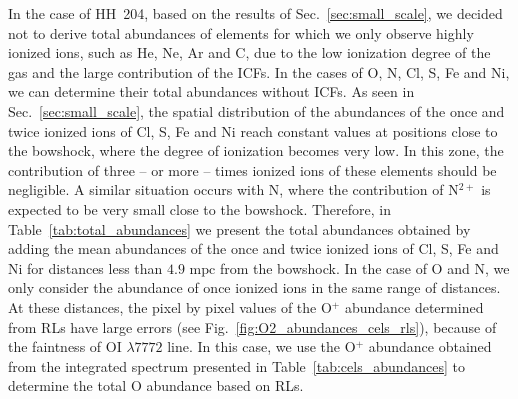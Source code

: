 \documentclass[twocolumn]{aastex63}
\begin{document}
In the case of HH~204, based on the results of Sec.~\ref{sec:small_scale}, we decided not to derive total abundances of elements for which we only observe highly ionized ions, such as He, Ne, Ar and C, due to the low ionization degree of the gas and the large contribution of the ICFs. In the cases of O, N, Cl, S, Fe and Ni, we can determine their total abundances without ICFs. %
As seen in Sec.~\ref{sec:small_scale}, the spatial distribution of the abundances of the once and twice ionized ions of Cl, S, Fe and Ni reach constant values at positions close to the bowshock, where the degree of ionization becomes very low. In this zone, the contribution of three -- or more -- times ionized ions of these elements should be negligible. A similar situation occurs with N, where the contribution of N$^{2+}$ is expected to be very small close to the bowshock. Therefore, in Table~\ref{tab:total_abundances} we present the total abundances  obtained by adding the mean abundances of the once and twice ionized ions of Cl, S, Fe and Ni for distances less than $4.9  \text{ mpc}$ from the bowshock. In the case of O and N, we only consider the abundance of once ionized ions in the same range of distances. At these distances, the pixel by pixel values of the O$^{+}$ abundance determined from RLs have large errors (see  Fig.~\ref{fig:O2_abundances_cels_rls}), because of the faintness of O\thinspace I $\lambda 7772$ line. In this case, we use the O$^{+}$ abundance obtained from the integrated spectrum presented in Table~\ref{tab:cels_abundances} to determine the total O abundance based on RLs.
\end{document}
